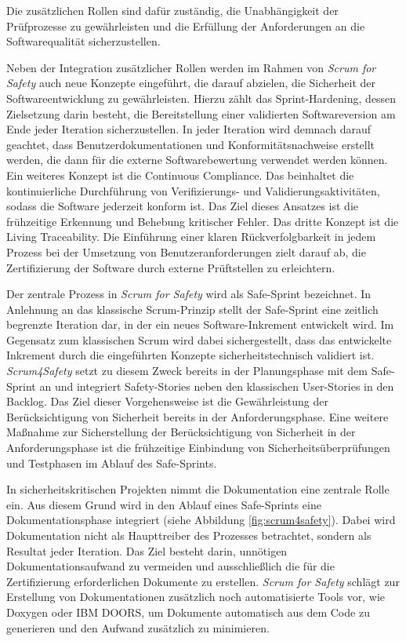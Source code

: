 \documentclass[acmtog]{acmart}
\begin{document}
Die zusätzlichen Rollen sind dafür zuständig, 
die Unabhängigkeit der Prüfprozesse zu gewährleisten und die Erfüllung der Anforderungen an die Softwarequalität sicherzustellen. \cite{barbareschi_scrum_2022}

Neben der Integration zusätzlicher Rollen werden im Rahmen von \textit{Scrum for Safety} auch neue Konzepte eingeführt, die darauf abzielen, die Sicherheit der Softwareentwicklung zu gewährleisten. 
Hierzu zählt das Sprint-Hardening, dessen Zielsetzung darin besteht, die Bereitstellung einer validierten Softwareversion am Ende jeder Iteration sicherzustellen. In jeder Iteration wird demnach darauf geachtet, 
dass Benutzerdokumentationen und Konformitätsnachweise erstellt werden, die dann für die externe Softwarebewertung verwendet werden können. \cite{barbareschi_scrum_2022}
Ein weiteres Konzept ist die Continuous Compliance. Das beinhaltet die kontinuierliche Durchführung von Verifizierungs- und Validierungsaktivitäten, sodass die Software jederzeit konform ist. 
Das Ziel dieses Ansatzes ist die frühzeitige Erkennung und Behebung kritischer Fehler. \cite{barbareschi_scrum_2022} Das dritte Konzept ist die Living Traceability.
Die Einführung einer klaren Rückverfolgbarkeit in jedem Prozess bei der Umsetzung von Benutzeranforderungen zielt darauf ab, die Zertifizierung der Software durch externe Prüftstellen zu erleichtern. \cite{barbareschi_scrum_2022}

Der zentrale Prozess in \textit{Scrum for Safety} wird als Safe-Sprint bezeichnet. In Anlehnung an das klassische Scrum-Prinzip stellt der Safe-Sprint eine zeitlich begrenzte Iteration dar, in der ein neues Software-Inkrement entwickelt wird. 
Im Gegensatz zum klassischen Scrum wird dabei sichergestellt, dass das entwickelte Inkrement durch die eingeführten Konzepte sicherheitstechnisch validiert ist. \cite{barbareschi_scrum_2022}
\textit{Scrum4Safety} setzt zu diesem Zweck bereits in der Planungsphase mit dem Safe-Sprint an und integriert Safety-Stories neben den klassischen User-Stories in den Backlog.
Das Ziel dieser Vorgehensweise ist die Gewährleistung der Berücksichtigung von Sicherheit bereits in der Anforderungsphase. 
Eine weitere Maßnahme zur Sicherstellung der Berücksichtigung von Sicherheit in der Anforderungsphase ist die frühzeitige Einbindung von Sicherheitsüberprüfungen und Testphasen im Ablauf des Safe-Sprints. \cite{barbareschi_scrum_2022}

In sicherheitskritischen Projekten nimmt die Dokumentation eine zentrale Rolle ein. Aus diesem Grund wird in den Ablauf eines Safe-Sprints eine Dokumentationsphase integriert (siehe Abbildung \ref{fig:scrum4safety}). 
Dabei wird Dokumentation nicht als Haupttreiber des Prozesses betrachtet, sondern als Resultat jeder Iteration. \cite{barbareschi_scrum_2022}
Das Ziel besteht darin, unnötigen Dokumentationsaufwand zu vermeiden und ausschließlich die für die Zertifizierung erforderlichen Dokumente zu erstellen. 
\textit{Scrum for Safety} schlägt zur Erstellung von Dokumentationen zusätzlich noch automatisierte Tools vor, wie Doxygen oder IBM DOORS, um Dokumente automatisch aus dem Code zu generieren und den Aufwand zusätzlich zu minimieren. \cite{barbareschi_scrum_2022}
\end{document}
